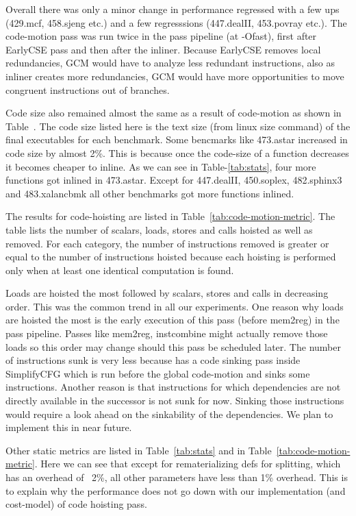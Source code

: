 \documentclass[acmlarge,review,anonymous]{acmart}\settopmatter{printfolios=true}
\begin{document}
Overall there was only a minor change in performance regressed with a few ups
(429.mcf, 458.sjeng etc.) and a few regresssions (447.dealII, 453.povray
etc.). The code-motion pass was run twice in the pass pipeline (at -Ofast),
first after EarlyCSE pass and then after the inliner. Because EarlyCSE removes
local redundancies, GCM would have to analyze less redundant instructions, also
as inliner creates more redundancies, GCM would have more opportunities to move
congruent instructions out of branches.

Code size also remained almost the same as a result of code-motion as shown in
Table~\cite{tab:code-size}.  The code size listed here is the text size (from
linux size command) of the final executables for each benchmark.  Some bencmarks
like 473.astar increased in code size by almost 2\%. This is because once the
code-size of a function decreases it becomes cheaper to inline. As we can see in
Table-\ref{tab:stats}, four more functions got inlined in 473.astar. Except for
447.dealII, 450.soplex, 482.sphinx3 and 483.xalancbmk all other benchmarks got
more functions inlined.

The results for code-hoisting are listed in
Table~\ref{tab:code-motion-metric}. The table lists the number of scalars,
loads, stores and calls hoisted as well as removed. For each category, the
number of instructions removed is greater or equal to the number of instructions
hoisted because each hoisting is performed only when at least one identical
computation is found.

Loads are hoisted the most followed by scalars, stores and calls in decreasing
order.  This was the common trend in all our experiments. One reason why loads
are hoisted the most is the early execution of this pass (before mem2reg) in the
\LLVM{} pass pipeline. Passes like mem2reg, instcombine might actually remove
those loads so this order may change should this pass be scheduled later. The number
of instructions sunk is very less because \LLVM{} has a code sinking pass inside SimplifyCFG
which is run before the global code-motion and sinks some instructions. Another reason is
that instructions for which dependencies are not directly available in the successor is
not sunk for now. Sinking those instructions would require a look ahead on the sinkability
of the dependencies. We plan to implement this in near future.

Other static metrics are listed in Table~\ref{tab:stats} and in
Table~\ref{tab:code-motion-metric}.  Here we can see that except for
rematerializing defs for splitting, which has an overhead of ~2\%, all other
parameters have less than 1\% overhead. This is to explain why the performance
does not go down with our implementation (and cost-model) of code hoisting pass.
\end{document}
